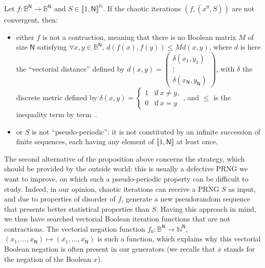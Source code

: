 \begin{proposition}
Let $f : \mathds{B}^\mathsf{N} \to \mathds{B}^\mathsf{N}$ and 
$S \in \llbracket 1, \mathsf{N} \rrbracket^{\mathds{N}}$. 
If the chaotic iterations $\left(f,(x^0,S)\right)$ are not convergent, then:
\begin{itemize}
\item either $f$ is not a contraction, meaning that there is no Boolean matrix
    $M$ of size $\mathsf{N}$ satisfying $\forall x,y\in \mathds{B}^\mathsf{N}$,
    $d(f(x),f(y)) \leqslant M d(x,y)$, where $d$ is here the ``vectorial distance''
    defined by $d(x,y) = \left(\begin{array}{c} \delta(x_1,y_1)\\ \vdots \\ \delta(x_\mathsf{N}, 
    y_\mathsf{N}) \end{array}\right)$, with $\delta$ the discrete metric defined by $\delta(x,y) = \left\{\begin{matrix} 1 &\mbox{if}\ x\neq y , \\ 0 &\mbox{if}\ x = y \end{matrix}\right.$, and $\leqslant$ is the inequality term by term~\cite{Robert1986}.
\item or $S$ is not ``pseudo-periodic'': it is not constituted by an infinite succession of finite sequences, each having any element of $\llbracket
    1, \mathsf{N} \rrbracket$ at least once.
\end{itemize}
\end{proposition}

The second alternative of the proposition above concerns the strategy,
which should be provided by the outside world: this is usually a defective
PRNG we want to improve, on which such a pseudo-periodic property
can be difficult to study. Indeed, in our opinion, 
chaotic iterations can receive a PRNG $S$ as input, and due to 
properties of disorder of $f$, generate a new pseudorandom sequence
that presents better statistical properties than $S$. Having this 
approach in mind, we thus have searched vectorial Boolean iteration
functions that are not contractions. The vectorial negation function
$f_0:\mathds{B}^\mathsf{N} \longrightarrow \mathds{N}^\mathsf{N},$
$(x_1, \hdots, x_\mathsf{N}) \longmapsto (\overline{x_1}, \hdots, 
\overline{x_\mathsf{N}}) $ is such a function, which explains why this
vectorial Boolean negation is often present in our generators 
(we recalls that $\overline{x}$ stands for the negation
of the Boolean $x$).

